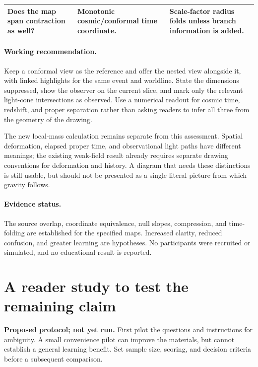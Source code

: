 \documentclass[11pt,a4paper]{article}
\begin{document}
\begin{center}
\begin{tabular}{@{}p{.25\linewidth}p{.33\linewidth}p{.34\linewidth}@{}}
{\raggedright Does the map span contraction as well?\par} & {\raggedright Monotonic cosmic/conformal time coordinate.\par} & {\raggedright Scale-factor radius folds unless branch information is added.\par}\\
\bottomrule
\end{tabular}
\end{center}

\paragraph{Working recommendation.}
Keep a conformal view as the reference and offer the nested view alongside
it, with linked highlights for the same event and worldline. State the
dimensions suppressed, show the observer on the current slice, and mark
only the relevant light-cone intersections as observed. Use a numerical
readout for cosmic time, redshift, and proper separation rather than
asking readers to infer all three from the geometry of the drawing.

The new local-mass calculation remains separate from this assessment.
Spatial deformation, elapsed proper time, and observational light paths
have different meanings; the existing weak-field result already requires
separate drawing conventions for deformation and history. A diagram that
needs these distinctions is still usable, but should not be presented as
a single literal picture from which gravity follows.

\paragraph{Evidence status.}
The source overlap, coordinate equivalence, null slopes, compression, and
time-folding are established for the specified maps. Increased clarity,
reduced confusion, and greater learning are hypotheses. No participants
were recruited or simulated, and no educational result is reported.

\clearpage
\section{A reader study to test the remaining claim}
\textbf{Proposed protocol; not yet run.} First pilot the questions and
instructions for ambiguity. A small convenience pilot can improve the
materials, but cannot establish a general learning benefit. Set sample
size, scoring, and decision criteria before a subsequent comparison.
\end{document}
